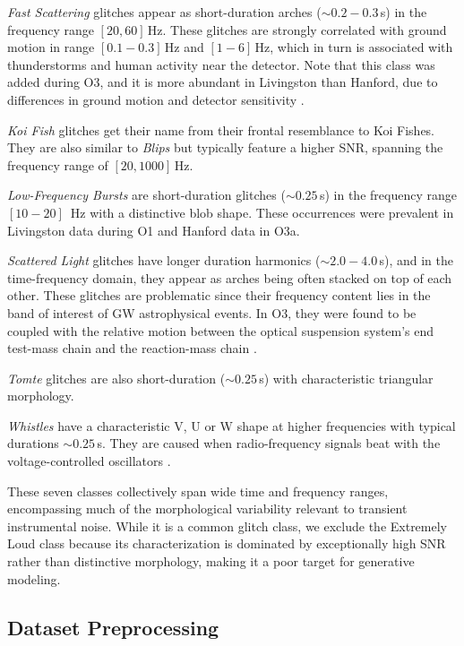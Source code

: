 \documentclass[reprint,nofootinbib,amsmath,amssymb,aps,floatfix]{revtex4-2}
\begin{document}
\textit{Fast Scattering} glitches appear as short-duration arches ($\sim 0.2 - 0.3\,$s) in the frequency range $[20, 60] \,$Hz. These glitches are strongly correlated with ground motion in range $[0.1 -0.3] \,$Hz and $[1-6] \,$Hz, which in turn is associated with thunderstorms and human activity near the detector. Note that this class was added during O3, and it is more abundant in Livingston than Hanford, due to differences in ground motion and detector sensitivity \cite{Soni:2021cjy}.

\textit{Koi Fish} glitches get their name from their frontal resemblance to Koi Fishes. They are also similar to \textit{Blips} but typically feature a higher SNR, spanning the frequency range of $[20, 1000] \,$Hz.

\textit{Low-Frequency Bursts} are short-duration  glitches ($\sim 0.25\,$s) in the frequency range $[10 - 20]\,$ Hz with a distinctive blob shape. These occurrences were prevalent in Livingston data during O1 and Hanford data in O3a.

\textit{Scattered Light} glitches have longer duration harmonics ($\sim2.0 - 4.0\,$s), and in the time-frequency domain, they appear as arches being often stacked on top of each other. These glitches are problematic since their frequency content lies in the band of interest of GW astrophysical events. In O3, they were found to be coupled with the relative motion between the optical suspension system’s end test-mass chain and the reaction-mass chain \cite{Soni:2021cjy}.

\textit{Tomte} glitches are also short-duration ($\sim 0.25\,$s) with characteristic triangular morphology.

\textit{Whistles} have a characteristic V, U or W shape at higher frequencies with typical durations $\sim 0.25\,$s. They are caused when radio-frequency signals beat with the voltage-controlled oscillators \cite{Nuttall:2015dqa}.

These seven classes collectively span wide time and frequency ranges, encompassing much of the morphological variability relevant to transient instrumental noise.
While it is a common glitch class, we exclude the Extremely Loud class because its characterization is dominated by exceptionally high SNR rather than distinctive morphology, making it a poor target for generative modeling.


\subsection{Dataset Preprocessing}
\end{document}
